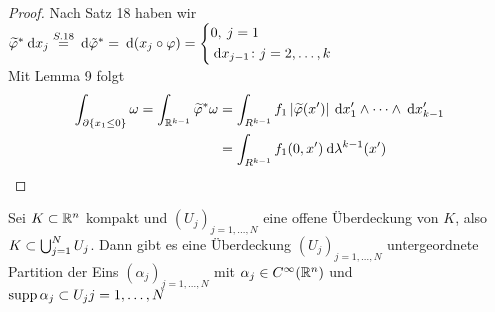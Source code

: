 \documentclass[skript.tex]{subfiles}
\begin{document}
\begin{lem}
\begin{proof}
					Nach Satz 18 haben wir $\wt{\varphi}^* \md x_j \overset{S.18}{=} \md \tilde{\varphi}^* = \md (x_j \circ \varphi) = \begin{cases*}
					0, \: j=1 \\ \md x_{j-1} \colon j= 2, \dots, k
					\end{cases*} $ \\
					
					Mit Lemma 9 folgt
					\begin{align*}
					\int_{\partial \{x_1 \leq 0 \}} \omega = \int_{\mathbb{R}^{k-1}} \widetilde{\varphi}^* \omega &=\int_ {R^{k-1}} f_1 \left| \widetilde{\varphi}(x') \right| \: \mathrm{d} x'_1 \wedge \dots \wedge \: \mathrm{d} x' _{k-1} \\ 
					&= \int _{R^{k-1}} f_1 (0,x') \: \mathrm{d} \lambda^{k-1}(x')
					\end{align*}
				\end{proof}
			\end{lem}
	
		\begin{theorem}
			Sei $K \subset {\mathbb{R}^n}$ kompakt und $(U_j)_{j=1, \dots, N}$ eine offene Überdeckung von $K$, also $K \subset \bigcup_{j =1}^{N} U_j$. Dann gibt es eine Überdeckung $(U_j)_{j = 1, \dots, N}$ untergeordnete Partition der Eins $(\alpha_j)_{j = 1, \dots, N}$ mit $\alpha_j \in C^{\infty} ({\mathbb{R}^n})$ und $\operatorname{supp} \alpha_j \subset U_j j = 1, \dots, N$
		\end{theorem}
	
\end{document}
